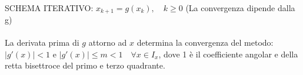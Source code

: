 \documentclass[a4paper, 11pt]{article}
\begin{document}
        \paragraph{}
        SCHEMA ITERATIVO: $x_{k+1} = g(x_k), \quad k \geq 0$ 
        (La convergenza dipende dalla g)

        \paragraph{}
        La derivata prima di $g$ attorno ad $x$ determina la convergenza del metodo: $|g'(x)| < 1$ e $|g'(x)| \leq m < 1 \quad \forall x \in I_x$, dove 1 è il coefficiente angolar e della retta bisettroce del primo e terzo quadrante.


    


 
 
\end{document}
